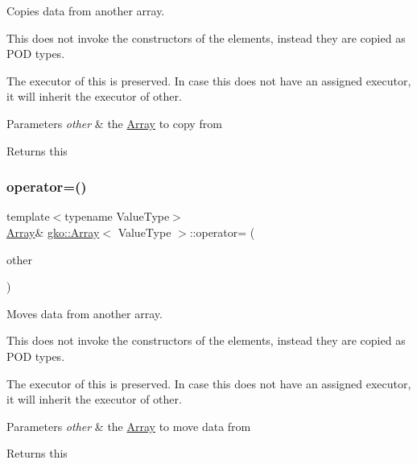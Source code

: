 Copies data from another array. 

This does not invoke the constructors of the elements, instead they are copied as P\+OD types.

The executor of this is preserved. In case this does not have an assigned executor, it will inherit the executor of other.


\begin{DoxyParams}{Parameters}
{\em other} & the \hyperlink{classgko_1_1Array}{Array} to copy from\\
\hline
\end{DoxyParams}
\begin{DoxyReturn}{Returns}
this 
\end{DoxyReturn}
\mbox{\label{classgko_1_1Array_a62d5346849e3943a5fcac962e344ab58}} 
\subsubsection{\texorpdfstring{operator=()}{operator=()}\hspace{0.1cm}{\footnotesize\ttfamily [2/2]}}
{\footnotesize\ttfamily template$<$typename Value\+Type$>$ \\
\hyperlink{classgko_1_1Array}{Array}\& \hyperlink{classgko_1_1Array}{gko\+::\+Array}$<$ Value\+Type $>$\+::operator= (\begin{DoxyParamCaption}\item[{\hyperlink{classgko_1_1Array}{Array}$<$ Value\+Type $>$ \&\&}]{other }\end{DoxyParamCaption})\hspace{0.3cm}{\ttfamily [inline]}}



Moves data from another array. 

This does not invoke the constructors of the elements, instead they are copied as P\+OD types.

The executor of this is preserved. In case this does not have an assigned executor, it will inherit the executor of other.


\begin{DoxyParams}{Parameters}
{\em other} & the \hyperlink{classgko_1_1Array}{Array} to move data from\\
\hline
\end{DoxyParams}
\begin{DoxyReturn}{Returns}
this 
\end{DoxyReturn}
\mbox{\label{classgko_1_1Array_ab42114c635a05ecff66e1ab5e5074d14}} 
